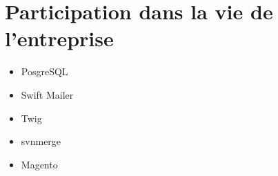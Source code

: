 \section{Participation dans la vie de l'entreprise}

\begin{itemize}
	\item PosgreSQL
	\item Swift Mailer
	\item Twig
	\item svnmerge
	\item Magento
\end{itemize}

